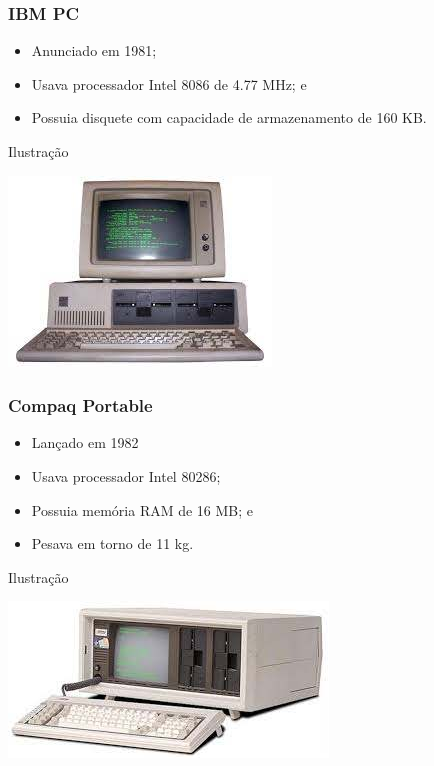 \documentclass[aspectratio=169]{beamer} %
\begin{document}
\begin{frame}
	\frametitle{IBM PC}
	
	\begin{itemize}
		\item Anunciado em 1981;
		\item Usava processador Intel 8086 de 4.77 MHz; e
		\item Possuia disquete com capacidade de armazenamento de 160 KB.
	\end{itemize}\vfill
	
	\begin{exampleblock}{Ilustra\c cão}
		\begin{center}
			\includegraphics[scale=0.4]{img/ibmpc}
		\end{center}		
	\end{exampleblock}
\end{frame}

\begin{frame}
	\frametitle{Compaq Portable}
	
	\begin{itemize}
		\item Lançado em 1982
		\item Usava processador Intel 80286; 
		\item Possuia memória RAM de 16 MB; e 
		\item Pesava em torno de 11 kg.
	\end{itemize}\vfill
	
	\begin{exampleblock}{Ilustra\c cão}
		\begin{center}
			\includegraphics[scale=0.4]{img/compac_portable}
		\end{center}			
	\end{exampleblock}
\end{frame}
\end{document}

